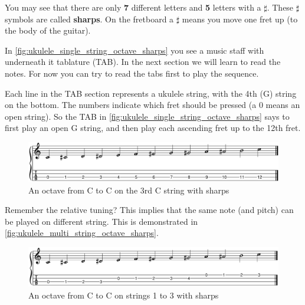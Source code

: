 You may see that there are only \textbf{7} different letters and \textbf{5} letters with a \textbf{$\sharp$}. These $\sharp$ symbols are called \textbf{sharps}. On the fretboard a $\sharp$ means you move one fret up (to the body of the guitar).


In \autoref{fig:ukulele_single_string_octave_sharps} you see a music staff with underneath it tablature (TAB). In the next section we will learn to read the notes. For now you can try to read the tabs first to play the sequence.

Each line in the TAB section represents a ukulele string, with the 4th (G) string on the bottom. The numbers indicate which fret should be pressed (a 0 means an open string). So the TAB in \autoref{fig:ukulele_single_string_octave_sharps} says to first play an open G string, and then play each ascending fret up to the 12th fret.

\begin{figure}[h]
    \centering
    \includegraphics[width=\textwidth]{../../MuseScore/Ukulele/UkuleleChromaticNotesSharpsSingleString.png}
    \caption{An octave from C to C on the 3rd C string with sharps}
    \label{fig:ukulele_single_string_octave_sharps}
\end{figure}

 Remember the relative tuning? This implies that the same note (and pitch) can be played on different string. This is demonstrated in \autoref{fig:ukulele_multi_string_octave_sharps}.

\begin{figure}[h]
    \centering
    \includegraphics[width=\textwidth]{../../MuseScore/Ukulele/UkuleleChromaticNotesSharpsMultiString.png}
    \caption{An octave from C to C on strings 1 to 3 with sharps}
    \label{fig:ukulele_multi_string_octave_sharps}
\end{figure}

